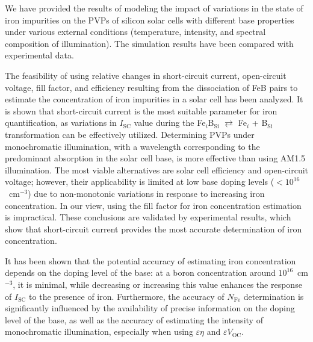 \documentclass[a4paper,fleqn]{cas-sc}
\begin{document}
\begin{mdframed}
We have provided the results of modeling the impact of variations in the
state of iron impurities on the PVPs of silicon solar cells
with different base properties under various external conditions
(temperature, intensity, and spectral composition of illumination).
The simulation results have been compared with experimental data.


The feasibility of using relative changes in short-circuit current, open-circuit voltage,
fill factor, and efficiency resulting from the dissociation of FeB pairs
to estimate the concentration of iron impurities in a solar cell has been analyzed.
It is shown that short-circuit current is the most suitable parameter \textcolor[rgb]{1.00,0.07,0.00}{for iron quantification, as variations in $I_\mathrm{SC}$ value during the
Fe$_i$B$_\mathrm{Si}$ $\rightleftarrows$ Fe$_i$ + B$_\mathrm{Si}$ transformation can be effectively utilized.
Determining} PVPs under monochromatic illumination,
with a wavelength corresponding to the predominant absorption in the solar cell base, is more effective than using AM1.5 illumination.
\textcolor[rgb]{1.00,0.07,0.00}{The most viable alternatives are solar cell }efficiency and open-circuit voltage;
however, their applicability is limited at low base doping levels ($<10^{16}$~cm$^{-3}$)
due to non-monotonic variations in response to increasing iron concentration.
In our view, using the fill factor for iron concentration estimation is impractical.
\textcolor[rgb]{1.00,0.07,0.00}{These conclusions are validated by experimental results, which show that short-circuit current provides the most accurate determination of iron concentration.}


It has been shown that the potential accuracy of estimating iron concentration depends
on the doping level of the base:
at a boron concentration around $10^{16}$~cm$^{-3}$, it is minimal,
while decreasing or increasing this value enhances the response of $I_\mathrm{SC}$ to the presence of iron.
Furthermore, the accuracy of $N_\mathrm{Fe}$ determination is significantly influenced by the availability
of precise information on the doping level of the base,
as well as the accuracy of estimating the intensity of monochromatic illumination,
especially when using $\varepsilon \eta$ and $\varepsilon V_\mathrm{OC}$.




\end{mdframed}
\end{document}
